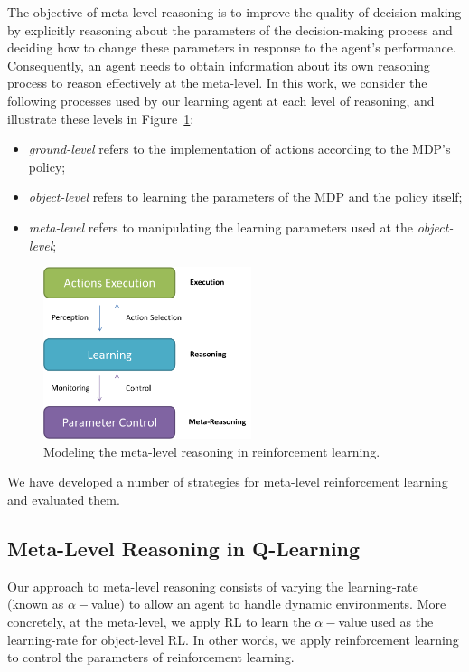 The objective of meta-level reasoning is to improve the quality of decision making by explicitly reasoning about the parameters of the decision-making process and deciding how to change these parameters in response to the agent's performance. 
Consequently, an agent needs to obtain information about its own reasoning process to reason effectively at the meta-level. 
In this work, we consider the following processes used by our learning agent at each level of reasoning, and illustrate these levels in Figure~\ref{fig:reasoningOnRL}:

\begin{itemize}
\item \textit{ground-level} refers to the implementation of actions according to the MDP's policy;
\item \textit{object-level} refers to learning the parameters of the MDP and the policy itself;
\item \textit{meta-level} refers to manipulating the learning parameters used at the \textit{object-level};
\end{itemize}

\begin{figure}[ht]
\centering
\includegraphics[width=230px]{images/reasoningOnRL}
\caption{Modeling the meta-level reasoning in reinforcement learning.}
\label{fig:reasoningOnRL}
\end{figure}

We have developed a number of strategies for meta-level reinforcement learning and evaluated them.



\subsection{Meta-Level Reasoning in Q-Learning}
\label{subsec:mlql}

Our approach to meta-level reasoning consists of varying the learning-rate (known as $\alpha-$value)
to allow an agent to handle dynamic environments. 
More concretely, at the meta-level, we apply RL to learn the $\alpha-$value used as the learning-rate for object-level RL. 
In other words, we apply reinforcement learning to control the parameters of reinforcement learning. 

